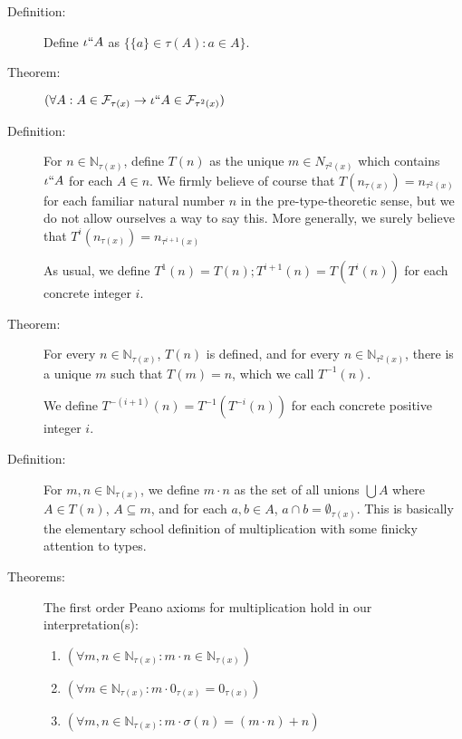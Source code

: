 \documentclass[12pt]{article}
\begin{document}
\begin{description}


\item[Definition:]  Define $\iota``A$ as $\{\{a\} \in \tau(A):a \in A\}$.

\item[Theorem:]  $(\forall A:A \in {\cal F}_{\tau(x)} \rightarrow \iota``A \in {\cal F}_{\tau^2(x)})$

\item[Definition:]  For $n \in \mathbb N_{\tau(x)}$, define $T(n)$ as the unique $m \in N_{\tau^2(x)}$ which contains $\iota``A$ for each $A \in n$.  We firmly believe of
course that $T(n_{\tau(x)}) = n_{\tau^2(x)}$ for each familiar natural number $n$ in the pre-type-theoretic sense, but we do not allow ourselves a way to say this.  More generally,
we surely believe that $T^i(n_{\tau(x)}) = n_{\tau^{i+1}(x)}$

As usual, we define $T^1(n) = T(n); T^{i+1}(n) = T(T^i(n))$ for each concrete integer $i$.

\item[Theorem:]  For every $n \in \mathbb N_{\tau(x)}$, $T(n)$ is defined, and for every $n \in \mathbb N_{\tau^2(x)}$, there is a unique $m$ such that $T(m)=n$, which we call $T^{-1}(n)$.

We define $T^{-(i+1)}(n) = T^{-1}(T^{-i}(n))$ for each concrete positive integer $i$.

\item[Definition:]  For $m,n \in \mathbb N_{\tau(x)}$, we define $m \cdot n$ as the set of all unions $\bigcup A$ where $A \in T(n)$, $A \subseteq m$, and for each $a,b \in A$, $a \cap b = \emptyset_{\tau(x)}$.  This is basically the elementary school definition of multiplication with some finicky attention to types.

\item[Theorems:]  The first order Peano axioms for multiplication hold in our interpretation(s):

\begin{enumerate}

\item $(\forall m,n \in \mathbb N_{\tau(x)}:m\cdot n \in \mathbb N_{\tau(x)})$

\item $(\forall m \in \mathbb N_{\tau(x)}:m\cdot 0_{\tau(x)} = 0_{\tau(x)})$

\item $(\forall m,n \in \mathbb N_{\tau(x)}:m\cdot\sigma(n) =( m\cdot n) + n)$

\end{enumerate}

\end{description}
\end{document}
